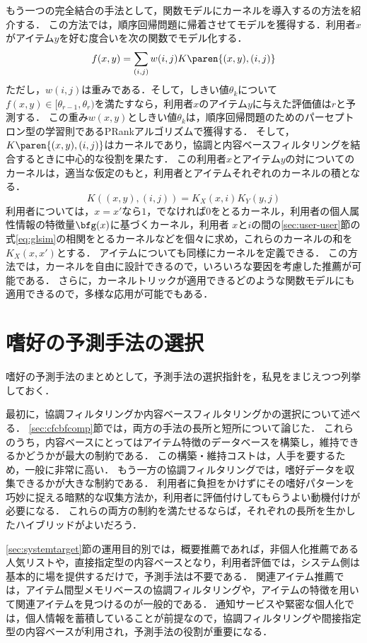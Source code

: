 もう一つの完全結合の手法として，関数モデルにカーネルを導入する\cite{icml:04:06}の方法を紹介する．
この方法では，順序回帰問題に帰着させてモデルを獲得する．利用者$x$がアイテム$y$を好む度合いを次の関数でモデル化する．
\[
f(x,y)=\sum_{(i,j)}w(i,j)K\paren{(x,y),(i,j)}
\]
ただし，$w(i,j)$は重みである．そして，しきい値$\theta_k$について$f(x,y)\in[\theta_{r-1},\theta_r)$を満たすなら，利用者$x$のアイテム$y$に与えた評価値は$r$と予測する．
この重み$w(x,y)$としきい値$\theta_k$は，順序回帰問題のためのパーセプトロン型の学習則であるPRankアルゴリズム\cite{nips:02:01}で獲得する．
そして，$K\paren{(x,y),(i,j)}$はカーネル\cite{jb:036:00}であり，協調と内容ベースフィルタリングを結合するときに中心的な役割を果たす．
この利用者$x$とアイテム$y$の対についてのカーネルは，適当な仮定のもと，利用者とアイテムそれぞれのカーネルの積となる．
\[
 K((x,y),(i,j))=K_X(x,i)K_Y(y,j)
\]
利用者については，$x=x'$なら$1$，でなければ$0$をとるカーネル，利用者の個人属性情報の特徴量$\bfg(x)$に基づくカーネル，利用者
$x$と$i$の間の\ref{sec:user-user}節の式\eqref{eq:glsim}の相関をとるカーネルなどを個々に求め，これらのカーネルの和を$K_X(x,x')$とする．
アイテムについても同様にカーネルを定義できる．
この方法では，カーネルを自由に設計できるので，いろいろな要因を考慮した推薦が可能である．
さらに，カーネルトリックが適用できるどのような関数モデルにも適用できるので，多様な応用が可能でもある．

\section{嗜好の予測手法の選択}
\label{sec:rsselect}

嗜好の予測手法のまとめとして，予測手法の選択指針を，私見をまじえつつ列挙しておく．

最初に，協調フィルタリングか内容ベースフィルタリングかの選択について述べる．
\ref{sec:cfcbfcomp}節では，両方の手法の長所と短所について論じた．
これらのうち，内容ベースにとってはアイテム特徴のデータベースを構築し，維持できるかどうかが最大の制約である．
この構築・維持コストは，人手を要するため，一般に非常に高い．
もう一方の協調フィルタリングでは，嗜好データを収集できるかが大きな制約である．
利用者に負担をかけずにその嗜好パターンを巧妙に捉える暗黙的な収集方法か，利用者に評価付けしてもらうよい動機付けが必要になる．
これらの両方の制約を満たせるならば，それぞれの長所を生かしたハイブリッドがよいだろう．

\ref{sec:systemtarget}節の運用目的別では，概要推薦であれば，非個人化推薦である人気リストや，直接指定型の内容ベースとなり，利用者評価では，システム側は基本的に場を提供するだけで，予測手法は不要である．
関連アイテム推薦では，アイテム間型メモリベースの協調フィルタリングや，アイテムの特徴を用いて関連アイテムを見つけるのが一般的である．
通知サービスや緊密な個人化では，個人情報を蓄積していることが前提なので，協調フィルタリングや間接指定型の内容ベースが利用され，予測手法の役割が重要になる．


